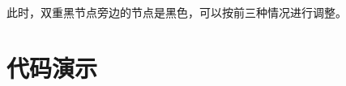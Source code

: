 \documentclass{note}
\begin{document}
此时，双重黑节点旁边的节点是黑色，可以按前三种情况进行调整。
\newpage
\section{代码演示\cite{insert_code}\cite{delete_code}}
\begin{framed}
    
\end{framed}


\end{document}
